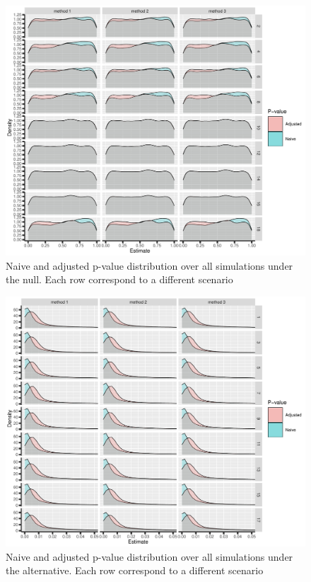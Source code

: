 \documentclass[12pt]{article}
\begin{document}
\begin{figure}[!h]
\centering
\includegraphics[trim={0 0 0 0},width=1\textwidth]{./figures/gg3stage-pvalue-density.pdf}
\caption{Naive and adjusted p-value distribution over all simulations under the null. Each row correspond to a different scenario}
\end{figure}

\begin{figure}[!h]
\centering
\includegraphics[trim={0 0 0 0},width=1\textwidth]{./figures/gg-pvalue2-density.pdf}
\caption{Naive and adjusted p-value distribution over all simulations under the alternative. Each row correspond to a different scenario}
\end{figure}
\end{document}
